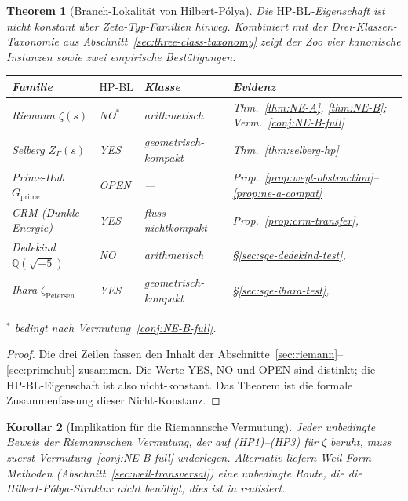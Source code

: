 \documentclass[11pt]{article}
\newtheorem{theorem}{Theorem}[section]
\newtheorem{corollary}[theorem]{Korollar}
\theoremstyle{definition}
\theoremstyle{remark}
\newcommand{\HBL}{\mathrm{HP\text{-}BL}}
\begin{document}
\begin{theorem}[Branch-Lokalität von Hilbert-P\'olya]\label{thm:boundary}
Die $\HBL$-Eigenschaft ist nicht konstant über Zeta-Typ-Familien hinweg.
Kombiniert mit der Drei-Klassen-Taxonomie aus
Abschnitt~\ref{sec:three-class-taxonomy} zeigt der Zoo vier
kanonische Instanzen sowie zwei empirische Bestätigungen:

\begin{center}
\renewcommand{\arraystretch}{1.15}
\begin{tabular}{@{}llll@{}}
\toprule
Familie & $\HBL$ & Klasse & Evidenz \\
\midrule
Riemann $\zeta(s)$ & NO${}^*$ & arithmetisch &
  Thm.~\ref{thm:NE-A}, \ref{thm:NE-B}; Verm.~\ref{conj:NE-B-full} \\
Selberg $Z_\Gamma(s)$ & YES & geometrisch-kompakt & Thm.~\ref{thm:selberg-hp} \\
Prime-Hub $G_\mathrm{prime}$ & OPEN & --- &
  Prop.~\ref{prop:weyl-obstruction}--\ref{prop:ne-a-compat} \\
CRM (Dunkle Energie) & YES & fluss-nichtkompakt & Prop.~\ref{prop:crm-transfer}, \cite{DyatlovZworski2019} \\
Dedekind $\mathbb{Q}(\sqrt{-5})$ & NO & arithmetisch & \S\ref{sec:sge-dedekind-test}, \cite{DedekindNEBTest} \\
Ihara $\zeta_{\text{Petersen}}$ & YES & geometrisch-kompakt & \S\ref{sec:sge-ihara-test}, \cite{IharaPetersenTest} \\
\bottomrule
\end{tabular}
\end{center}
${}^*$ bedingt nach Vermutung~\ref{conj:NE-B-full}.
\end{theorem}

\begin{proof}
Die drei Zeilen fassen den Inhalt der
Abschnitte~\ref{sec:riemann}--\ref{sec:primehub} zusammen. Die Werte YES,
NO und OPEN sind distinkt; die $\HBL$-Eigenschaft ist also nicht-konstant.
Das Theorem ist die formale Zusammenfassung
dieser Nicht-Konstanz.
\end{proof}

\begin{corollary}[Implikation für die Riemannsche Vermutung]
\label{cor:rh-consequence}
Jeder unbedingte Beweis der Riemannschen Vermutung, der auf
(HP1)--(HP3) für $\zeta$ beruht, muss zuerst
Vermutung~\ref{conj:NE-B-full} widerlegen. Alternativ liefern
Weil-Form-Methoden (Abschnitt~\ref{sec:weil-transversal}) eine unbedingte Route,
die die Hilbert-P\'olya-Struktur nicht benötigt; dies ist
in \cite{Geiger2026RHII} realisiert.
\end{corollary}
\end{document}
